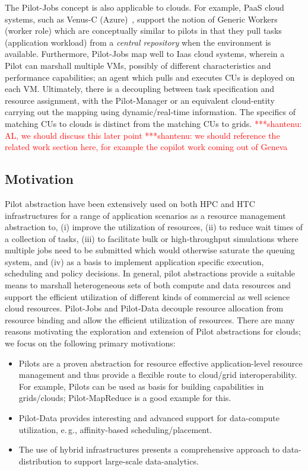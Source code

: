 \documentclass[times]{cpeauth}
\newcommand{\jhanote}[1]{ {\textcolor{red} { ***shantenu: #1 }}}
\newcommand{\jhanote}[1]{}
\newcommand{\pilot}{Pilot\xspace}
\newcommand{\pilots}{Pilots\xspace}
\newcommand{\pilotjobs}{Pilot-Jobs\xspace}
\newcommand{\pilotdata}{Pilot-Data\xspace}
\newcommand{\cus}{CUs\xspace}
\begin{document}
The \pilotjobs concept is also applicable to clouds. For example, PaaS
cloud systems, such as Venus-C (Azure)~\cite{venusc-generic-worker},
support the notion of Generic Workers (worker role) which are
conceptually similar to pilots in that they pull tasks (application
workload) from a {\it central repository} when the environment is
available. Furthermore, \pilotjobs map well to Iaas cloud systems,
wherein a \pilot can marshall multiple VMs, possibly of different
characteristics and performance capabilities; an agent which pulls and
executes \cus is deployed on each VM. Ultimately, there is a
decoupling between task specification and resource assignment, with
the \pilot-Manager or an equivalent cloud-entity carrying out the
mapping using dynamic/real-time information. The specifics of matching
\cus to clouds is distinct from the matching \cus to
grids.\jhanote{AL, we should discuss this later point} \jhanote{we
  should reference the related work section here, for example the
  copilot work coming out of Geneva}

\subsection{Motivation}

\pilot abstraction have been extensively used on both HPC and HTC
infrastructures for a range of application scenarios as a resource
management abstraction to, (i) improve the utilization of resources,
(ii) to reduce wait times of a collection of tasks, (iii) to
facilitate bulk or high-throughput simulations where multiple jobs
need to be submitted which would otherwise saturate the queuing
system, and (iv) as a basis to implement application specific
execution, scheduling and policy decisions.  In general, pilot
abstractions provide a suitable means to marshall heterogeneous sets
of both compute and data resources and support the efficient
utilization of different kinds of commercial as well science cloud
resources.  \pilotjobs and \pilotdata decouple resource allocation
from resource binding and allow the efficient utilization of
resources.  There are many reasons motivating the exploration and
extension of \pilot abstractions for clouds; we focus on the following
primary motivations:

\begin{itemize}
\item \pilots are a proven abstraction for resource effective
  application-level resource management and thus provide a flexible
  route to cloud/grid interoperability. For example, \pilots can be used as 
  basis for building capabilities in grids/clouds; Pilot-MapReduce is a good 
  example for this.
\item \pilotdata provides interesting and advanced support for
  data-compute utilization, e.\,g., affinity-based scheduling/placement.
\item The use of hybrid infrastructures presents a comprehensive
  approach to data-distribution to support large-scale data-analytics.
\end{itemize}
\end{document}
